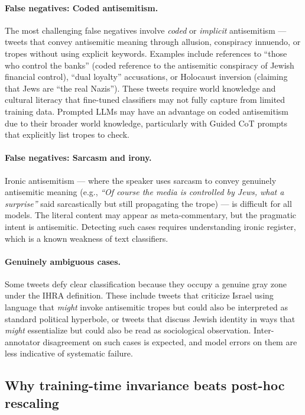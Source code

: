 \paragraph{False negatives: Coded antisemitism.}
The most challenging false negatives involve \emph{coded} or \emph{implicit} antisemitism --- tweets that convey antisemitic meaning through allusion, conspiracy innuendo, or tropes without using explicit keywords. Examples include references to ``those who control the banks'' (coded reference to the antisemitic conspiracy of Jewish financial control), ``dual loyalty'' accusations, or Holocaust inversion (claiming that Jews are ``the real Nazis''). These tweets require world knowledge and cultural literacy that fine-tuned classifiers may not fully capture from limited training data. Prompted LLMs may have an advantage on coded antisemitism due to their broader world knowledge, particularly with Guided CoT prompts that explicitly list tropes to check.

\paragraph{False negatives: Sarcasm and irony.}
Ironic antisemitism --- where the speaker uses sarcasm to convey genuinely antisemitic meaning (e.g., \emph{``Of course the media is controlled by Jews, what a surprise''} said sarcastically but still propagating the trope) --- is difficult for all models. The literal content may appear as meta-commentary, but the pragmatic intent is antisemitic. Detecting such cases requires understanding ironic register, which is a known weakness of text classifiers.

\paragraph{Genuinely ambiguous cases.}
Some tweets defy clear classification because they occupy a genuine gray zone under the IHRA definition. These include tweets that criticize Israel using language that \emph{might} invoke antisemitic tropes but could also be interpreted as standard political hyperbole, or tweets that discuss Jewish identity in ways that \emph{might} essentialize but could also be read as sociological observation. Inter-annotator disagreement on such cases is expected, and model errors on them are less indicative of systematic failure.

\subsection{Why training-time invariance beats post-hoc rescaling}
\label{sec:disc_training_time}

